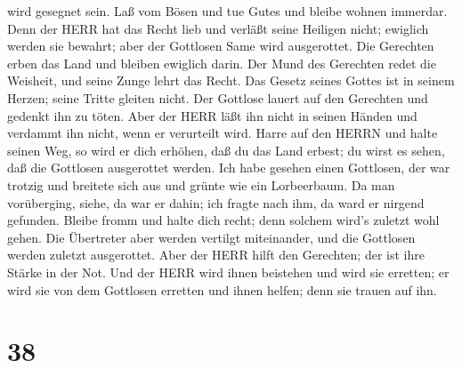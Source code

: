 wird gesegnet sein.  Laß vom Bösen und tue Gutes und bleibe
wohnen immerdar.  Denn der HERR hat das Recht lieb und
verläßt seine Heiligen nicht; ewiglich werden sie bewahrt; aber der
Gottlosen Same wird ausgerottet.  Die Gerechten erben das
Land und bleiben ewiglich darin.  Der Mund des Gerechten
redet die Weisheit, und seine Zunge lehrt das Recht.  Das
Gesetz seines Gottes ist in seinem Herzen; seine Tritte gleiten nicht.
 Der Gottlose lauert auf den Gerechten und gedenkt ihn zu
töten.  Aber der HERR läßt ihn nicht in seinen Händen und
verdammt ihn nicht, wenn er verurteilt wird.  Harre auf den
HERRN und halte seinen Weg, so wird er dich erhöhen, daß du das Land
erbest; du wirst es sehen, daß die Gottlosen ausgerottet werden.
 Ich habe gesehen einen Gottlosen, der war trotzig und
breitete sich aus und grünte wie ein Lorbeerbaum.  Da man
vorüberging, siehe, da war er dahin; ich fragte nach ihm, da ward er
nirgend gefunden.  Bleibe fromm und halte dich recht; denn
solchem wird's zuletzt wohl gehen.  Die Übertreter aber
werden vertilgt miteinander, und die Gottlosen werden zuletzt
ausgerottet.  Aber der HERR hilft den Gerechten; der ist
ihre Stärke in der Not.  Und der HERR wird ihnen beistehen
und wird sie erretten; er wird sie von dem Gottlosen erretten und ihnen
helfen; denn sie trauen auf ihn.

\hypertarget{section-37}{%
\section{38}\label{section-37}}

